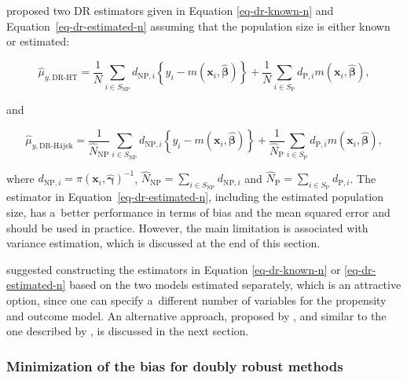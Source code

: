 \documentclass[nojss]{jss}
\begin{document}
\citet{chen2020doubly} proposed two DR estimators given in Equation
\ref{eq-dr-known-n} and Equation~\ref{eq-dr-estimated-n} assuming that
the population size is either known or estimated:

\begin{equation}
\hat{\mu}_{y,\text{DR-HT}}=\frac{1}{N} \sum_{i \in S_{\text{NP}}} d_{\text{NP},i}\left\{y_i-m\left(\boldsymbol{x}_i, \hat{\boldsymbol{\beta}}\right)\right\}+\frac{1}{N} \sum_{i \in S_{\text{P}}} d_{\text{P},i} m\left(\boldsymbol{x}_i, \hat{\boldsymbol{\beta}}\right),
\label{eq-dr-known-n}
\end{equation}

and

\begin{equation}
\hat{\mu}_{y,\text{DR-H\'{a}jek}}=\frac{1}{\hat{N}_{\text{NP}}} \sum_{i \in S_{\text{NP}}} d_{\text{NP},i}\left\{y_i-m\left(\boldsymbol{x}_i, \hat{\boldsymbol{\beta}}\right)\right\}+\frac{1}{\hat{N}_{\text{P}}} \sum_{i \in S_{\text{P}}} d_{\text{P},i} m\left(\boldsymbol{x}_i, \hat{\boldsymbol{\beta}}\right),
\label{eq-dr-estimated-n}
\end{equation}

where
\(d_{\text{NP},i}=\pi\left(\boldsymbol{x}_i, \hat{\boldsymbol{\gamma}}\right)^{-1}\),
\(\hat{N}_{\text{NP}}=\sum_{i \in S_{\text{NP}}} d_{\text{NP},i}\) and
\(\hat{N}_{\text{P}}=\sum_{i \in S_{\text{P}}} d_{\text{P},i}\). The
estimator in Equation~\ref{eq-dr-estimated-n}, including the estimated
population size, has a~better performance in terms of bias and the mean
squared error and should be used in practice. However, the main
limitation is associated with variance estimation, which is discussed at
the end of this section.

\citet{chen2020doubly} suggested constructing the estimators in Equation
\ref{eq-dr-known-n} or \ref{eq-dr-estimated-n} based on the two models
estimated separately, which is an attractive option, since one can
specify a~different number of variables for the propensity and outcome
model. An alternative approach, proposed by \citet{yang_doubly_2020},
and similar to the one described by \citet{kim2014doubly}, is discussed
in the next section.

\subsubsection{Minimization of the bias for doubly robust
methods}\label{minimization-of-the-bias-for-doubly-robust-methods}
\end{document}
